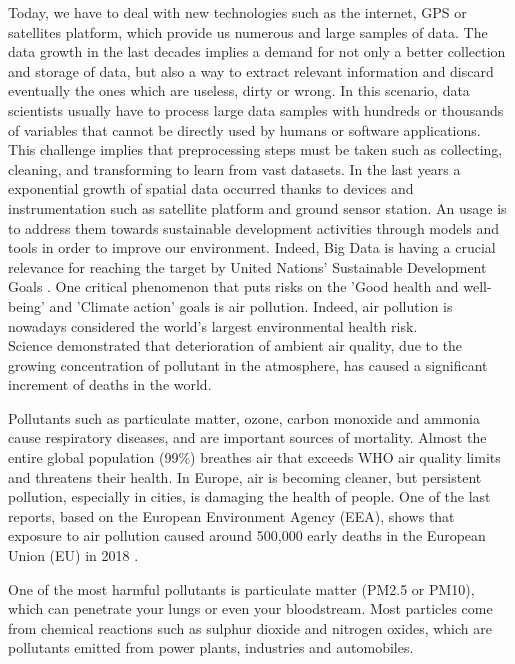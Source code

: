 Today, we have to deal with new technologies such as the internet, GPS or satellites platform, which provide us numerous and large samples of data. The data growth in the last decades implies a demand for not only a better collection and storage of data, but also a way to extract relevant information and discard eventually the ones which are useless, dirty or wrong.
In this scenario, data scientists usually have to process large data samples with hundreds or thousands of variables that \cite{garcia2016big} cannot be directly used by humans or software applications.
This challenge implies that preprocessing steps must be taken such as collecting, cleaning, and transforming to learn from vast datasets.
In the last years a exponential growth of spatial data occurred thanks to devices and instrumentation such as satellite platform and ground sensor station. 
An usage is to address them towards sustainable development activities through models and tools in order to improve our environment. Indeed, Big Data is having a crucial relevance for reaching the target by United Nations’ Sustainable Development Goals \cite{zhang2019orchestrating}.
One critical phenomenon that puts risks on the 'Good health and well-being' and 'Climate action' goals is air pollution.
Indeed, air pollution is nowadays considered the world's largest environmental health risk.\\
Science demonstrated that deterioration of ambient air quality, due to the growing concentration of pollutant in the atmosphere, has caused a significant increment of deaths in the world.\par  
Pollutants such as particulate matter, ozone, carbon monoxide and ammonia cause respiratory diseases, and are important sources of mortality.
Almost the entire global population (99\%) breathes air that exceeds WHO air quality limits and threatens their health.\newline
In Europe, air is becoming cleaner, but persistent pollution, especially in cities, is damaging the health of people. One of the last reports, based on the European Environment Agency (EEA), shows that exposure to air pollution caused around 500,000 early deaths in the European Union (EU) in 2018 \cite{european2018air}.\par
One of the most harmful pollutants is particulate matter (PM2.5 or PM10), which can penetrate your lungs or even your bloodstream\newline. Most particles come from chemical reactions such as sulphur dioxide and nitrogen oxides, which are pollutants emitted from power plants, industries and automobiles.\par

